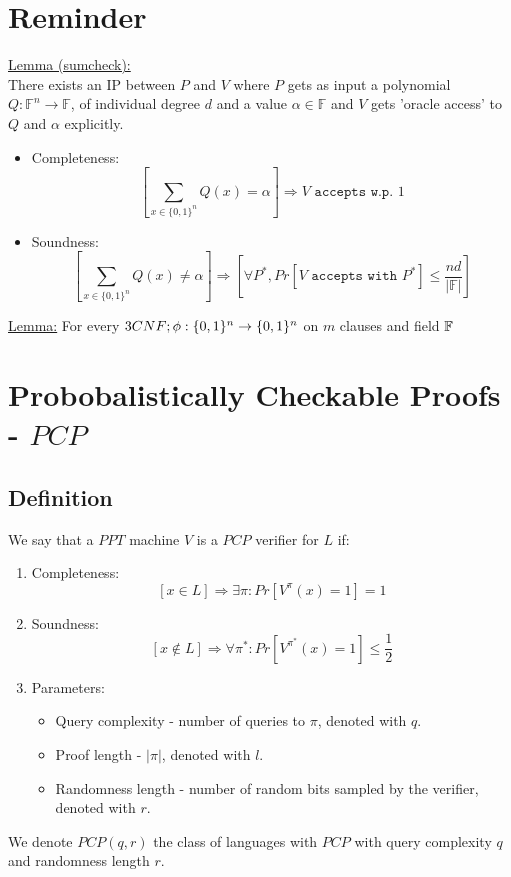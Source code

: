 \section*{Reminder}
\underline{Lemma (sumcheck):}\\
There exists an IP between $P$ and $V$ where $P$
gets as input a polynomial $Q:\mathbb{F}^n\rightarrow\mathbb{F}$,
of individual degree $d$ and a value $\alpha\in\mathbb{F}$
and $V$ gets 'oracle access' to $Q$ and $\alpha$ explicitly.

\begin{itemize}
	\item Completeness:
	\[\left[
		\sum_{x\in\{0,1\}^n}Q(x)=\alpha
	\right]
	\Rightarrow V \texttt{ accepts w.p. }1\]
	\item Soundness:
	\[\left[
		\sum_{x\in\{0,1\}^n}Q(x)\neq\alpha
	\right]
	\Rightarrow\left[
		\forall P^*, Pr[V \texttt{ accepts with }P^*]\leq\frac{nd}{|\mathbb{F}|}
	\right]\]
\end{itemize}

\underline{Lemma:}
For every $3CNF; \phi:\{0,1\}^n\rightarrow\{0,1\}^n$
on $m$ clauses and field $\mathbb{F}$ %

\section*{Probobalistically Checkable Proofs - $PCP$}
\subsection*{Definition}
We say that a $PPT$ machine $V$ is a $PCP$ verifier
for $L$ if:
\begin{enumerate}
	\item Completeness:
	\[
		\left[x\in L\right]
		\Rightarrow \exists\pi: Pr[V^\pi(x)=1]=1
	\]
	\item Soundness:
	\[
		\left[x\notin L\right]
		\Rightarrow \forall\pi^*: Pr[V^{\pi^*}(x)=1]\leq\frac{1}{2}
	\]
	\item Parameters:
	\begin{itemize}
		\item Query complexity - number of queries to $\pi$, denoted with $q$.
		\item Proof length - $|\pi|$, denoted with $l$.
		\item Randomness length - number of random bits sampled by the verifier, denoted with $r$.
	\end{itemize}
\end{enumerate}
We denote $PCP(q,r)$ the class of languages
with $PCP$ with query complexity $q$ and randomness length $r$.

